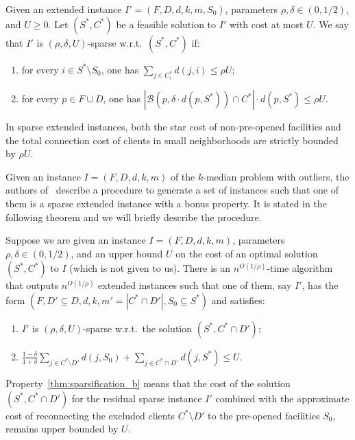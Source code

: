 \begin{definition}
    \label{def:sparse_extended_instances}
Given an extended instance ${I' = (F,D,d,k,m,S_0)}$, parameters $\rho, \delta \in (0, 1/2)$, and $U \ge 0$. Let $(S^*, C^*)$ be a feasible solution to $I'$ with cost at most $U$. We say that $I'$ is $(\rho, \delta, U)$-sparse w.r.t.\ $(S^*, C^*)$ if:
\begin{enumerate}[label=\thedefinition\alph*)]
    \item \label{def:sparse_extended_instances_a} for every $i \in S^* \setminus S_0$, one has $\sum_{j \in C_i^*} d(j, i) \leq \rho U$;
    \item \label{def:sparse_extended_instances_b} for every $p \in F \cup D$, one has $|\mathcal{B}(p, \delta \cdot d(p, S^*)) \cap C^*| \cdot d(p, S^*) \leq \rho U$.
\end{enumerate}
\end{definition}

In sparse extended instances, both the star cost of non-pre-opened facilities and the total connection cost of clients in small neighborhoods are strictly bounded by $\rho U$.

Given an instance $I = (F,D,d,k,m)$ of the $k$-median problem with outliers, the authors of~\cite{KLS2018} describe a procedure to generate a set of instances such that one of them is a sparse extended instance with a bonus property. It is stated in the following theorem and we will briefly describe the procedure.

\begin{theorem} \label{thm:sparsification}
Suppose we are given an instance $I = (F, D, d, k, m)$, parameters $\rho, \delta \in (0, 1/2)$, and an upper bound $U$ on the cost of an optimal solution $(S^*, C^*)$ to $I$ (which is not given to us). There is an $n^{O(1/\rho)}$-time algorithm that outputs $n^{O(1/\rho)}$ extended instances such that one of them, say $I'$, has the form $(F, {D' \subseteq D}, d, k,{ m' = |C^* \cap D'|}, S_0 \subseteq S^*)$ and satisfies:
\begin{enumerate}[label=\thedefinition\alph*)]
    \item \label{thm:sparsification_a} $I'$ is $(\rho, \delta, U)$-sparse w.r.t.\ the solution $(S^*, C^* \cap D')$;
    \item \label{thm:sparsification_b} $\frac{1-\delta}{1+\delta} \sum_{j \in C^* \setminus D'} d(j, S_0) + \sum_{j \in C^* \cap D'} d(j, S^*) \leq U$.
\end{enumerate}
\end{theorem}
Property~\ref{thm:sparsification_b} means that the cost of the solution $(S^*, C^* \cap D')$ for the residual sparse instance $I'$ combined with the approximate cost of reconnecting the excluded clients $C^* \setminus D'$ to the pre-opened facilities $S_0$, remains upper bounded by $U$. 

